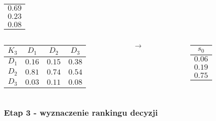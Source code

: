 \documentclass{beamer}
\begin{document}
\begin{frame}
\begin{columns}
\begin{column}{0.1\textwidth}
\begin{table}
\begin{tabular}{c}
				$0.69$\\
				$0.23$\\
				$0.08$
				\end{tabular}
			\end{table}
		\end{column}
	\end{columns}
	\begin{columns}
		\begin{column}{0.4\textwidth}
			\begin{table}
				\begin{tabular}{c|c|c|c}
				$K_3$	&	$D_1$	&	$D_2$	&	$D_3$\\ \hline
				$D_1$	&	$0.16$	&	$0.15$	&	$0.38$\\ \hline
				$D_2$	&	$0.81$	&	$0.74$	&	$0.54$\\ \hline
				$D_3$	&	$0.03$	&	$0.11$	&	$0.08$
				\end{tabular}
			\end{table}
		\end{column}
		\begin{column}{0.1\textwidth}
			$\rightarrow$
		\end{column}
		\begin{column}{0.1\textwidth}
			\begin{table}
				\begin{tabular}{c}
				$s_0$\\ \hline
				$0.06$\\
				$0.19$\\
				$0.75$
				\end{tabular}
			\end{table}
		\end{column}
	\end{columns}
\end{frame}

\begin{frame}
\frametitle{Etap 3 - wyznaczenie rankingu decyzji}
\end{frame}
\end{document}
